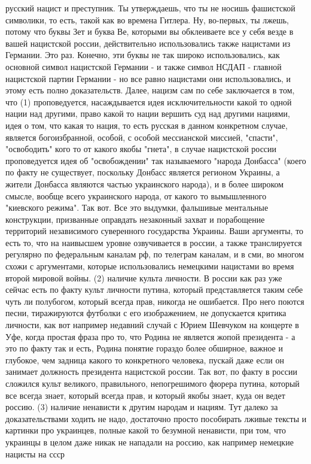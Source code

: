 русский нацист и преступник. Ты утверждаешь, что ты не носишь фашистской
символики, то есть, такой как во времена Гитлера. Ну, во-первых, ты лжешь,
потому что буквы Зет и буква Ве, которыми вы обклеиваете все у себя везде в
вашей нацистской россии, действительно использовались также нацистами из
Германии. Это раз. Конечно, эти буквы не так широко использовались, как
основной символ нацистской Германии - и также символ НСДАП - главной нацистской
партии Германии - но все равно нацистами они использовались, и этому есть полно
доказательств. Далее, нацизм сам по себе заключается в том, что (1)
проповедуется, насаждывается идея исключительности какой то одной нации над
другими, право какой то нации вершить суд над другими нациями, идея о том, что
какая то нация, то есть русская в данном конкретном случае, является
богоизбранной, особой, с особой мессианской миссией, "спасти", "освободить"
кого то от какого якобы "гнета", в случае нацистской россии проповедуется идея
об "освобождении" так называемого "народа Донбасса" (коего по факту не
существует, поскольку Донбасс является регионом Украины, а жители Донбасса
являются частью украинского народа), и в более широком смысле, вообще всего
украинского народа, от какого то вымышленного "киевского режима". Так вот.  Все
это выдумки, фальшивые ментальные конструкции, призванные оправдать незаконный
захват и порабощение территорий независимого суверенного государства Украины.
Ваши аргументы, то есть то, что на наивысшем уровне озвучивается в россии, а
также транслируется регулярно по федеральным каналам рф, по телеграм каналам, и
в сми, во многом схожи с аргументами, которые использовались немецкими
нацистами во время второй мировой войны.  (2) наличие культа личности. В россии
как раз уже сейчас есть по факту культ личности путина, который представляется
таким себе чуть ли полубогом, который всегда прав, никогда не ошибается. Про
него поются песни, тиражируются футболки с его изображением, не допускается
критика личности, как вот например недавний случай с Юрием Шевчуком на концерте
в Уфе, когда простая фраза про то, что Родина не является жопой президента - а
это по факту так и есть, Родина понятие гораздо более обширное, важное и
глубокое, чем задница какого то конкретного человека, пускай даже если он
занимает должность президента нацистской россии. Так вот, по факту в россии
сложился культ великого, правильного, непогрешимого фюрера путина, который все
всегда знает, который всегда прав, и который якобы знает, куда он ведет россию.
(3) наличие ненависти к другим народам и нациям. Тут далеко за доказательствами
ходить не надо, достаточно просто пособирать лживые тексты и картинки про
украинцев, полные какой то безумной ненависти, при том, что украинцы в целом
даже никак не нападали на россию, как например немецкие нацисты на ссср

